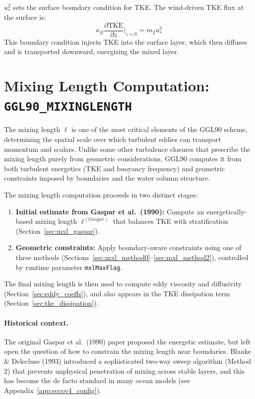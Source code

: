 \documentclass[12pt,letterpaper]{article}
\newcommand{\TKE}{\mathrm{TKE}}
\begin{document}
$u_*^2$ sets the surface boundary condition for TKE. The wind-driven TKE flux
at the surface is:
\[
\kappa_E \frac{\partial \TKE}{\partial z}\bigg|_{z=0} = m_2 u_*^3
\]
This boundary condition injects TKE into the surface layer, which then
diffuses and is transported downward, energizing the mixed layer.

\section{Mixing Length Computation: \texttt{GGL90\_MIXINGLENGTH}}

The mixing length $\ell$ is one of the most critical elements of the GGL90 scheme, determining the spatial scale over which turbulent eddies can transport momentum and scalars. Unlike some other turbulence closures that prescribe the mixing length purely from geometric considerations, GGL90 computes it from both turbulent energetics (TKE and buoyancy frequency) and geometric constraints imposed by boundaries and the water column structure.

The mixing length computation proceeds in two distinct stages:

\begin{enumerate}
\item \textbf{Initial estimate from Gaspar et al.\ (1990):} Compute an energetically-based mixing length $\ell^{(Gaspar)}$ that balances TKE with stratification (Section~\ref{sec:mxl_gaspar}).
\item \textbf{Geometric constraints:} Apply boundary-aware constraints using one of three methods (Sections~\ref{sec:mxl_method0}--\ref{sec:mxl_method2}), controlled by runtime parameter \verb|mxlMaxFlag|.
\end{enumerate}

The final mixing length is then used to compute eddy viscosity and diffusivity (Section~\ref{sec:eddy_coeffs}), and also appears in the TKE dissipation term (Section~\ref{sec:tke_dissipation}).

\paragraph{Historical context.} The original Gaspar et al.\ (1990) paper proposed the energetic estimate, but left open the question of how to constrain the mixing length near boundaries. Blanke \& Delecluse (1993) introduced a sophisticated two-way sweep algorithm (Method 2) that prevents unphysical penetration of mixing across stable layers, and this has become the de facto standard in many ocean models (see Appendix~\ref{app:eccov4_config}).
\end{document}
